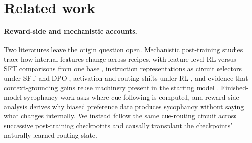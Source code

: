 \documentclass{article}
\begin{document}
\section{Related work}
\label{sec:related}

\paragraph{Reward-side and mechanistic accounts.} Two literatures leave the origin question open. Mechanistic post-training studies trace how internal features change across recipes, with feature-level RL-versus-SFT comparisons from one base \citep{shi2026rlfeatures}, instruction representations as circuit selectors under SFT and DPO \citep{bigoulaeva2026patches}, activation and routing shifts under RL \citep{zhang2026rlcircuitry}, and evidence that context-grounding gains reuse machinery present in the starting model \citep{gupta2026grounding}. Finished-model sycophancy work asks where cue-following is computed, and reward-side analysis derives why biased preference data produces sycophancy \citep{shapira2026rlhf} without saying what changes internally. We instead follow the same cue-routing circuit across successive post-training checkpoints and causally transplant the checkpoints' naturally learned routing state.
\end{document}
